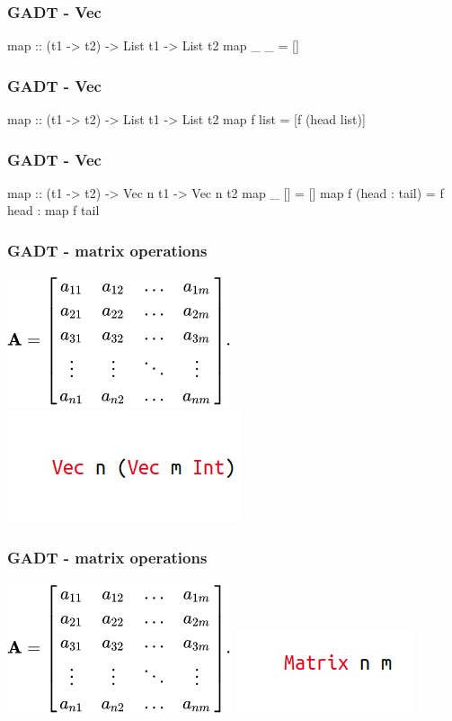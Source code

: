 \documentclass{beamer}
\newenvironment{VerbExample}
{\example\semiverbatim}
{\endsemiverbatim\endexample}
\begin{document}
\begin{frame}[fragile]
  \frametitle{GADT - Vec}
  \begin{VerbExample}
map :: (t1 -> t2) -> List t1 -> List t2
map _ _ = []
  \end{VerbExample}
\end{frame}

\begin{frame}[fragile]
  \frametitle{GADT - Vec}
  \begin{VerbExample}
map :: (t1 -> t2) -> List t1 -> List t2
map f list = [f (head list)]
  \end{VerbExample}
\end{frame}

\begin{frame}[fragile]
  \frametitle{GADT - Vec}
  \begin{VerbExample}
map :: (t1 -> t2) -> Vec n t1 -> Vec n t2
map _ [] = []
map f (head : tail) = f head : map f tail
  \end{VerbExample}
\end{frame}

\begin{frame}[fragile]
  \frametitle{GADT - matrix operations}
    \includegraphics[scale=0.5]{matrix.png}
    \includegraphics[scale=0.5]{vec.png}
\end{frame}

\begin{frame}[fragile]
  \frametitle{GADT - matrix operations}
    \includegraphics[scale=0.5]{matrix.png}
    \includegraphics[scale=0.5]{mat.png}
\end{frame}
\end{document}
